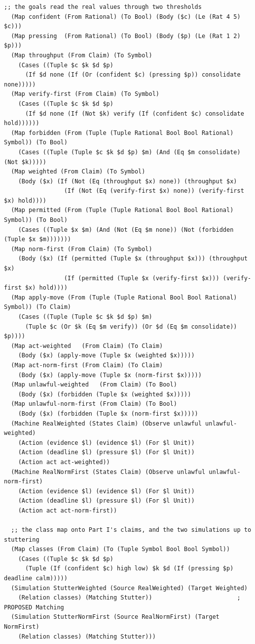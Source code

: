\documentclass[11pt]{article}
\theoremstyle{definition}
\theoremstyle{plain}
\begin{document}
\begin{lstlisting}[style=mettamod]
  ;; the goals read the real values through two thresholds
  (Map confident (From Rational) (To Bool) (Body ($c) (Le (Rat 4 5) $c)))
  (Map pressing  (From Rational) (To Bool) (Body ($p) (Le (Rat 1 2) $p)))
  (Map throughput (From Claim) (To Symbol)
    (Cases ((Tuple $c $k $d $p)
      (If $d none (If (Or (confident $c) (pressing $p)) consolidate none)))))
  (Map verify-first (From Claim) (To Symbol)
    (Cases ((Tuple $c $k $d $p)
      (If $d none (If (Not $k) verify (If (confident $c) consolidate hold))))))
  (Map forbidden (From (Tuple (Tuple Rational Bool Bool Rational) Symbol)) (To Bool)
    (Cases ((Tuple (Tuple $c $k $d $p) $m) (And (Eq $m consolidate) (Not $k)))))
  (Map weighted (From Claim) (To Symbol)
    (Body ($x) (If (Not (Eq (throughput $x) none)) (throughput $x)
                 (If (Not (Eq (verify-first $x) none)) (verify-first $x) hold))))
  (Map permitted (From (Tuple (Tuple Rational Bool Bool Rational) Symbol)) (To Bool)
    (Cases ((Tuple $x $m) (And (Not (Eq $m none)) (Not (forbidden (Tuple $x $m)))))))
  (Map norm-first (From Claim) (To Symbol)
    (Body ($x) (If (permitted (Tuple $x (throughput $x))) (throughput $x)
                 (If (permitted (Tuple $x (verify-first $x))) (verify-first $x) hold))))
  (Map apply-move (From (Tuple (Tuple Rational Bool Bool Rational) Symbol)) (To Claim)
    (Cases ((Tuple (Tuple $c $k $d $p) $m)
      (Tuple $c (Or $k (Eq $m verify)) (Or $d (Eq $m consolidate)) $p))))
  (Map act-weighted   (From Claim) (To Claim)
    (Body ($x) (apply-move (Tuple $x (weighted $x)))))
  (Map act-norm-first (From Claim) (To Claim)
    (Body ($x) (apply-move (Tuple $x (norm-first $x)))))
  (Map unlawful-weighted   (From Claim) (To Bool)
    (Body ($x) (forbidden (Tuple $x (weighted $x)))))
  (Map unlawful-norm-first (From Claim) (To Bool)
    (Body ($x) (forbidden (Tuple $x (norm-first $x)))))
  (Machine RealWeighted (States Claim) (Observe unlawful unlawful-weighted)
    (Action (evidence $l) (evidence $l) (For $l Unit))
    (Action (deadline $l) (pressure $l) (For $l Unit))
    (Action act act-weighted))
  (Machine RealNormFirst (States Claim) (Observe unlawful unlawful-norm-first)
    (Action (evidence $l) (evidence $l) (For $l Unit))
    (Action (deadline $l) (pressure $l) (For $l Unit))
    (Action act act-norm-first))

  ;; the class map onto Part I's claims, and the two simulations up to stuttering
  (Map classes (From Claim) (To (Tuple Symbol Bool Bool Symbol))
    (Cases ((Tuple $c $k $d $p)
      (Tuple (If (confident $c) high low) $k $d (If (pressing $p) deadline calm)))))
  (Simulation StutterWeighted (Source RealWeighted) (Target Weighted)
    (Relation classes) (Matching Stutter))                        ; PROPOSED Matching
  (Simulation StutterNormFirst (Source RealNormFirst) (Target NormFirst)
    (Relation classes) (Matching Stutter)))


\end{lstlisting}
\end{document}
